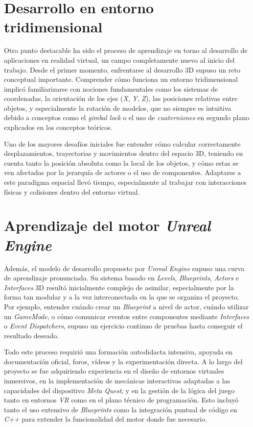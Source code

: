 \section {Desarrollo en entorno tridimensional}

Otro punto destacable ha sido el proceso de aprendizaje en torno al desarrollo de aplicaciones en realidad virtual, un campo completamente nuevo al inicio del trabajo. Desde el primer momento, enfrentarse al desarrollo 3D supuso un reto conceptual importante. Comprender cómo funciona un entorno tridimensional implicó familiarizarse con nociones fundamentales como los sistemas de coordenadas, la orientación de los ejes (\textit{X}, \textit{Y}, \textit{Z}), las posiciones relativas entre objetos, y especialmente la rotación de modelos, que no siempre es intuitiva debido a conceptos como el \textit{gimbal lock} o el uso de \textit{cuaterniones} en segundo plano explicados en los conceptos teóricos.

Uno de los mayores desafíos iniciales fue entender cómo calcular correctamente desplazamientos, trayectorias y movimientos dentro del espacio 3D, teniendo en cuenta tanto la posición absoluta como la local de los objetos, y cómo estas se ven afectadas por la jerarquía de actores o el uso de componentes. Adaptarse a este paradigma espacial llevó tiempo, especialmente al trabajar con interacciones físicas y colisiones dentro del entorno virtual.

\section{Aprendizaje del motor \textit{Unreal Engine}}

Además, el modelo de desarrollo propuesto por \textit{Unreal Engine} supuso una curva de aprendizaje pronunciada. Su sistema basado en \textit{Levels}, \textit{Blueprints}, \textit{Actors} e \textit{Interfaces} 3D resultó inicialmente complejo de asimilar, especialmente por la forma tan modular y a la vez interconectada en la que se organiza el proyecto. Por ejemplo, entender cuándo crear un \textit{Blueprint} a nivel de actor, cuándo utilizar un \textit{GameMode}, o cómo comunicar eventos entre componentes mediante \textit{Interfaces} o \textit{Event Dispatchers}, supuso un ejercicio continuo de pruebas hasta conseguir el resultado deseado.

Todo este proceso requirió una formación autodidacta intensiva, apoyada en documentación oficial, foros, vídeos y la experimentación directa. A lo largo del proyecto se fue adquiriendo experiencia en el diseño de entornos virtuales inmersivos, en la implementación de mecánicas interactivas adaptadas a las capacidades del dispositivo \textit{Meta Quest}, y en la gestión de la lógica del juego tanto en entornos \textit{VR} como en el plano técnico de programación. Esto incluyó tanto el uso extensivo de \textit{Blueprints} como la integración puntual de código en \textit{C++} para extender la funcionalidad del motor donde fue necesario.

